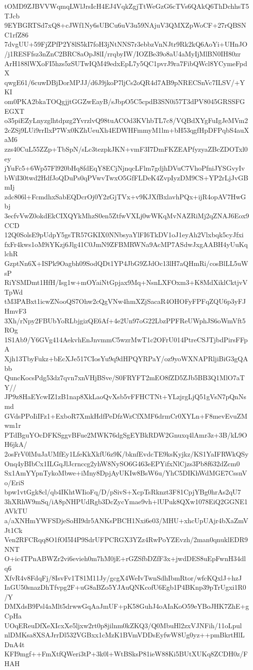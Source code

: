 tOMD9ZJBVVWqmqLWlJrsIcH4EJ4VqkZgjTtWeGzG6cTVs6QAkQ6ThDchhsT5TJcb
9EYBGRTSd7xQ8+cJWf1Ny6sUBCu6uV3u59NAjuV3QMXZpWoCF+27rQBSNC1rfZ86
7dvgUU+59FjZPfP2Y8lS5kI7foH3jNtNNS7r3ebbzVnNJtr9Rk2kQ6AoYi+UHnJO
/j1RESFfsz3nZnC2BRC8aOpJ8lI/rrqbyIW/IOZBe39o8aU4aMyIjMlBN0IH80zr
ArH188lWXoFI5hzs5zSUTwIQM49edxEpL7y5QC1pvrJ9ra7FibQWcl8YCymeFpdX
qwgE61/6cuwDBjDorMPJJ/d6J9jkoP7ljCs2oQR4d7AB9pNRECSnVc7ILSV/+YKI
om0PKA2bkaTOQgjjtGGZwEayB/sJbpO5C5cpdB3SN0i57T3dPV8045GRSSFGEGXT
o35piEZyLnyzglhtdpzg2YvrzlvQ98tuACOd3KVhbTL7c8/VQBdXYgFuIgJeMVm2
2cZSj9LUi9rrIlxP7Wx0KZhUeuXh4EDWHFmmyM1lm+bH53qgfHpDFPqbS4auXaM6
zzs40CuL55ZZp+TbSpN/sLc3tezpkJKN+vmF3I7DmFKZEAPfyzyaZBcZDOTxl0ey
jYuFc5+6Wp57Fl920bHq8fdEqY8ECjNjnqcLFlm7gdjhDVuC7VhoPfniJYSGvyIv
bWiI30twd2HdfJoQDuPs0qPVwvTwxO5GfFLDeK4ZvpIyzDM9CS+YP2rLjJvGBmIj
zdc806l+FcmdhxSabEQDcrOj0Y2zGjTVx+v9KJXfBxlavhPQx+ijR4opAV7HwGbj
3ecfvVwZ0okdEkCIXQYkMhzS0en5ZtfwVXLj0wWKqMvNAZRiMj2qZNAJ6Eox9CCD
12Q0SolsE9pUdpY5gsTR57GKIX0NNbsyaYlFI6TkDV1oJ1eyAh2Vlxbqk5cyJfxi
fxFr4kws1oM9iYKzj6Jlg41C0JmN9ZFBMRWNa9AcMP7ASdwJxgAABH4yUuKqlchR
GzptNn6X+ISPk9Oagbh09SodQDt1YP4JbG9ZJdOc13lH7aQHmRi/cosBlLL5uWsP
RiYSMDmt1HfH/Isg1w+mOYaiNtGpjax9Mq+NsnLXFOxm3+K8MdXiklCktjvVTpWd
tM3PABxt1icwZNooQS7Ohw2cQgVNw4hmXZjSacaR4OHOFyFPFqZQU6p3yFJHmvF3
3Xh/rNpy2FBUbYoRLbjgizQE6Af+4e2Un97oG22LbzPPFReUWphJS6oWmVft5ROg
1S1Ab9/Y6GVg414AekvhEnJnvmmC5wzrMwT1c2OFrU014PtreCSJTjbdPirsFFpA
Xjh13TbyFukz+bEcXJe517CIosYu9q9dHPQYRPaY/oz9yoWXNAPRljiBiG3gQAbb
QuncKocsPdg53dz7qvn7xnVHjBSve/S0FRYFT2mEO8fZD5ZJb5BB3Q1MlO7aTY//
JP9z8HaEYcwIZ1zB1nap8XkLaoQvXsb5vFFHCTNt+YLzjrgLjQ51gVsN7pQnNsmd
GVdsPPoIiIFz1+ExboR7XmkHdfPeDfzWzCfXMF6drmCr0XYLn+F8mevEvuZMwm1r
PTdBguYOcDFKSggvBFue2MWK76dgSgEYBkRDW2Gnuxq4lAmr3z+3B/kL9OH6jkA/
2osFrV0lMuJaUMfEy1LfeKkXkfU6z9K/bknfEvdcTE9ksKyjkz/KS1YaIFRWkQSy
Onq4yBIbCx1ILGqJlJcrnccg2yhW8NySO6G463eEPYifxNlCjzs3Pb8f632dZcm0
Sx1AmYYpnTykoMbwe+iMny8DpjAyUKIw8BsW6u/YhC5DIKhWdMGE7CssnVo/EriS
bpw1vtGgk8cl/qb4IKhtWIioFq/D/pSivS+XcpTsRknzt3F81CpjYBg0hrAs2qU7
3hXRhW9mSq/iA8pNHPUdRgb3DcZycYmae9vh+lUPuk8QXw1078EiQ2GGNE1AVkTU
a/aXNHmYWFSDjeSoHI9dr5ANKsPBCH1Nxi6e03/MHU+xhcUpUAjr4bXaZmVJt1Ck
Ven2RFCRqq8O1fOI5I4P9SdrUFPCRGX3YZz4RwPoYZEvzh/2man0qnuklEDR9NNT
O+ic4TPnABWZr2vi6evieh0m7hM0jE+rGZSfbDZfF3x+jwdDES8uEpFwnH34dlq6
XfvR4v8FdqFj/8IsvFv1T81M11Jy/gcgX4WeIvTwnSdhIbmRtor/wfcKQxlJ+hzJ
IaGU50snazDhTfvpg2F+uG8aBZo5YJAuQNKcofU6Egb1P4BKnp39pTrUgxi1R0/Y
DMXdsB9Psl4aMlt5drwwGqAaJmUF+pK58GuhJ4oAIaKoO59eYBoJHK7ZhE+gCpHa
UOqEReuDfXeXIcxXe5ljxw2rt0p8jilnm0kZKQ3/Q0MbuHl2zxVJNFih/11oLpul
nlDMKsa8XSAJrrDl532VGBxx1cMzK1BVmVDDsEyfwW8Ug0yz++pmBkrtHlLDnA4t
KFI9mgf++FmXtfQWeri3tP+3k0l+WtBSksP81ieW88Ki5BUtXUKq8ZCDH0z/FHAH
